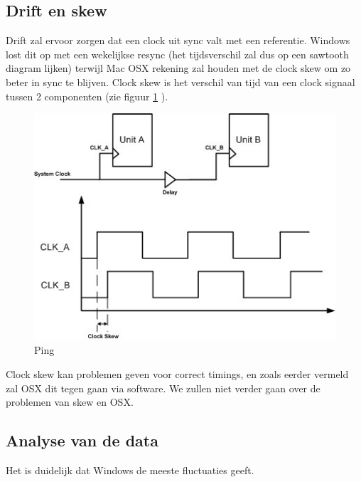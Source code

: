 \subsection{Drift en skew}

Drift zal ervoor zorgen dat een clock uit sync valt met een referentie. Windows lost dit op met een wekelijkse resync (het tijdsverschil zal dus op een sawtooth diagram lijken) terwijl Mac OSX rekening zal houden met de clock skew om zo beter in sync te blijven.
Clock skew is het verschil van tijd van een clock signaal tussen 2 componenten (zie figuur \ref{skew1} \cite{skew}).

\begin{figure}[h]
\centering
\includegraphics[scale=0.7]{img/skew.jpg}
\caption{Ping} \label{skew1}
\end{figure}


Clock skew kan problemen geven voor correct timings, en zoals eerder vermeld zal OSX dit tegen gaan via software. We zullen niet verder gaan over de problemen van skew en OSX. 


\subsection{Analyse van de data}

Het is duidelijk dat Windows de meeste fluctuaties geeft. 
















